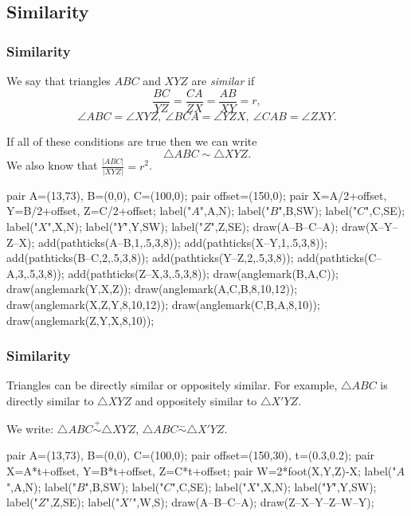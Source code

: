\documentclass{beamer}
\begin{document}
  \subsection{Similarity}
    \begin{frame}[fragile]
      \frametitle{Similarity}
      We say that triangles $ABC$ and $XYZ$ are \emph{similar} if
      \[\frac{BC}{YZ}=\frac{CA}{ZX}=\frac{AB}{XY}=r,\]
      \[\angle ABC=\angle XYZ,\
      \angle BCA=\angle YZX,\ \angle CAB=\angle ZXY.\]

      If all of these conditions are true then we can write \[\triangle
      ABC\sim\triangle XYZ.\] We also know that $\frac{|ABC|}{|XYZ|}=r^2$.

      \begin{center}
        \begin{asy}
          pair A=(13,73), B=(0,0), C=(100,0);
          pair offset=(150,0);
          pair X=A/2+offset, Y=B/2+offset, Z=C/2+offset;
          label("$A$",A,N);
          label("$B$",B,SW);
          label("$C$",C,SE);
          label("$X$",X,N);
          label("$Y$",Y,SW);
          label("$Z$",Z,SE);
          draw(A--B--C--A);
          draw(X--Y--Z--X);
          add(pathticks(A--B,1,.5,3,8));
          add(pathticks(X--Y,1,.5,3,8));
          add(pathticks(B--C,2,.5,3,8));
          add(pathticks(Y--Z,2,.5,3,8));
          add(pathticks(C--A,3,.5,3,8));
          add(pathticks(Z--X,3,.5,3,8));
          draw(anglemark(B,A,C));
          draw(anglemark(Y,X,Z));
          draw(anglemark(A,C,B,8,10,12));
          draw(anglemark(X,Z,Y,8,10,12));
          draw(anglemark(C,B,A,8,10));
          draw(anglemark(Z,Y,X,8,10));
        \end{asy}
      \end{center}
    \end{frame}
    \begin{frame}[fragile]
      \frametitle{Similarity}
      Triangles can be directly similar or oppositely similar. For example,
      $\triangle ABC$ is directly similar to $\triangle XYZ$ and oppositely
      similar to $\triangle X'YZ$.

      We write: $\triangle ABC\overset +\sim\triangle XYZ$, $\triangle
      ABC\overset -\sim\triangle X'YZ$.

      \begin{center}
        \begin{asy}
          pair A=(13,73), B=(0,0), C=(100,0);
          pair offset=(150,30), t=(0.3,0.2);
          pair X=A*t+offset, Y=B*t+offset, Z=C*t+offset;
          pair W=2*foot(X,Y,Z)-X;
          label("$A$",A,N);
          label("$B$",B,SW);
          label("$C$",C,SE);
          label("$X$",X,N);
          label("$Y$",Y,SW);
          label("$Z$",Z,SE);
          label("$X'$",W,S);
          draw(A--B--C--A);
          draw(Z--X--Y--Z--W--Y);
        \end{asy}
      \end{center}
    \end{frame}
\end{document}
